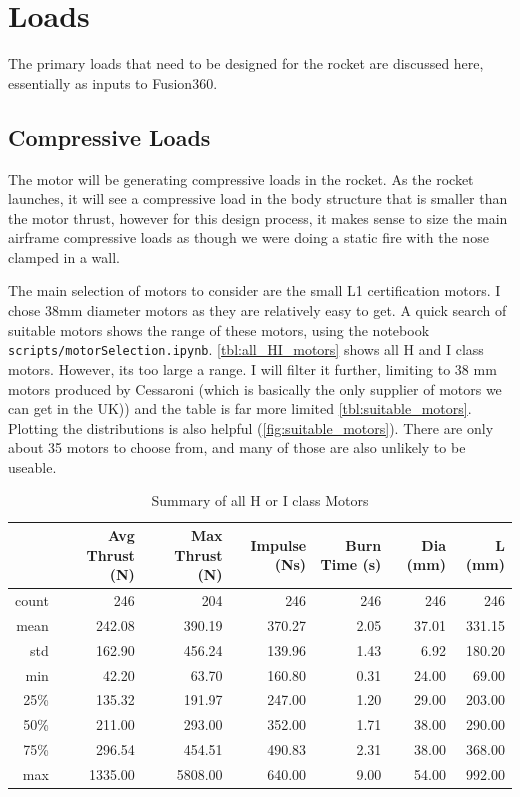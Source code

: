 \documentclass[11pt]{article}
\begin{document}
\section{Loads}

The primary loads that need to be designed for the rocket are discussed here, essentially as inputs to Fusion360. 

\subsection{Compressive Loads}

The motor will be generating compressive loads in the rocket. As the rocket launches, it will see a compressive load in the body structure that is smaller than the motor thrust, however for this design process, it makes sense to size the main airframe compressive loads as though we were doing a static fire with the nose clamped in a wall.

The main selection of motors to consider are the small L1 certification motors. I chose 38mm diameter motors as they are relatively easy to get. A quick search of suitable motors shows the range of these motors, using the notebook \texttt{scripts/motorSelection.ipynb}. \autoref{tbl:all_HI_motors} shows all H and I class motors. However, its too large a range. I will filter it further, limiting to 38 mm motors produced by Cessaroni (which is basically the only supplier of motors we can get in the UK)) and the table is far more limited \autoref{tbl:suitable_motors}. Plotting the distributions is also helpful (\autoref{fig:suitable_motors}). There are only about 35 motors to choose from, and many of those are also unlikely to be useable. 


\begin{table}[tbhp]
   \centering
   \caption{Summary of all H or I class Motors}
\begin{tabular}{@{}rrrrrrr@{}}
\toprule
& Avg Thrust (N) & Max Thrust (N) & Impulse (Ns) & Burn Time (s) & Dia (mm)   & L (mm)     \\ \midrule
count        & 246 & 204     & 246  & 246 & 246 & 246 \\
mean         & 242.08   & 390.19     & 370.27  & 2.05   & 37.01  & 331.15 \\
std          & 162.90   & 456.24     & 139.96  & 1.43   & 6.92   & 180.20 \\
min          & 42.20    & 63.70      & 160.80  & 0.31   & 24.00  & 69.00  \\
25\%         & 135.32   & 191.97     & 247.00  & 1.20   & 29.00  & 203.00 \\
50\%         & 211.00   & 293.00     & 352.00  & 1.71   & 38.00  & 290.00 \\
75\%         & 296.54   & 454.51     & 490.83  & 2.31   & 38.00  & 368.00 \\
max          & 1335.00  & 5808.00    & 640.00  & 9.00   & 54.00  & 992.00 \\ \bottomrule
\end{tabular}
   \label{tbl:all_HI_motors}
\end{table}
\end{document}
